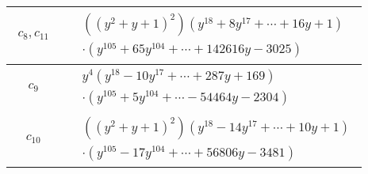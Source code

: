\documentclass[1p]{elsarticle_modified}
\theoremstyle{definition}
\begin{document}
\begin{tabular}{m{50pt}|m{274pt}}
\hline $$\begin{aligned}c_{8},c_{11}\end{aligned}$$&$\begin{aligned}
&((y^2+y+1)^2)(y^{18}+8 y^{17}+\cdots+16 y+1)\\
&\cdot(y^{105}+65 y^{104}+\cdots+142616 y-3025)
\end{aligned}$\\
\hline $$\begin{aligned}c_{9}\end{aligned}$$&$\begin{aligned}
&y^4(y^{18}-10 y^{17}+\cdots+287 y+169)\\
&\cdot(y^{105}+5 y^{104}+\cdots-54464 y-2304)
\end{aligned}$\\
\hline $$\begin{aligned}c_{10}\end{aligned}$$&$\begin{aligned}
&((y^2+y+1)^2)(y^{18}-14 y^{17}+\cdots+10 y+1)\\
&\cdot(y^{105}-17 y^{104}+\cdots+56806 y-3481)
\end{aligned}$\\
\hline
\end{tabular}
\vskip 2pc
\end{document}
